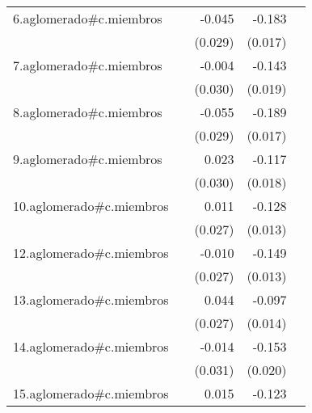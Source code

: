 {\begin{longtable}{l*{4}{D{.}{.}{-1}}}
\addlinespace
6.aglomerado#c.miembros&                     &      -0.045         &      -0.183\sym{***}&                     \\
            &                     &     (0.029)         &     (0.017)         &                     \\
\addlinespace
7.aglomerado#c.miembros&                     &      -0.004         &      -0.143\sym{***}&                     \\
            &                     &     (0.030)         &     (0.019)         &                     \\
\addlinespace
8.aglomerado#c.miembros&                     &      -0.055         &      -0.189\sym{***}&                     \\
            &                     &     (0.029)         &     (0.017)         &                     \\
\addlinespace
9.aglomerado#c.miembros&                     &       0.023         &      -0.117\sym{***}&                     \\
            &                     &     (0.030)         &     (0.018)         &                     \\
\addlinespace
10.aglomerado#c.miembros&                     &       0.011         &      -0.128\sym{***}&                     \\
            &                     &     (0.027)         &     (0.013)         &                     \\
\addlinespace
12.aglomerado#c.miembros&                     &      -0.010         &      -0.149\sym{***}&                     \\
            &                     &     (0.027)         &     (0.013)         &                     \\
\addlinespace
13.aglomerado#c.miembros&                     &       0.044         &      -0.097\sym{***}&                     \\
            &                     &     (0.027)         &     (0.014)         &                     \\
\addlinespace
14.aglomerado#c.miembros&                     &      -0.014         &      -0.153\sym{***}&                     \\
            &                     &     (0.031)         &     (0.020)         &                     \\
\addlinespace
15.aglomerado#c.miembros&                     &       0.015         &      -0.123\sym{***}&                     \\

\end{longtable}}
